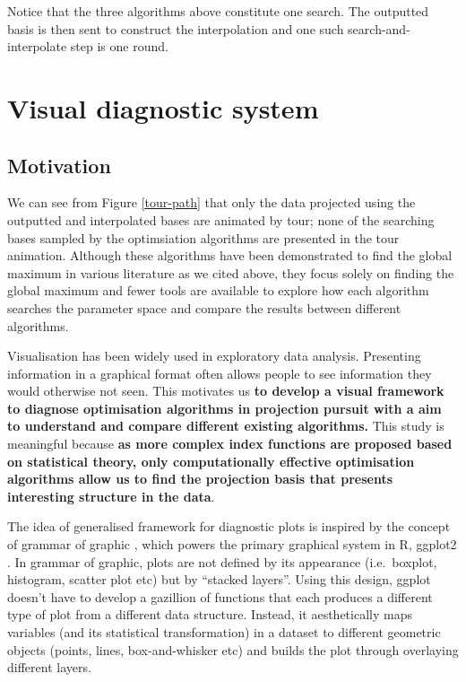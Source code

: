 \documentclass[12pt]{article}
\begin{document}
Notice that the three algorithms above constitute one search. The
outputted basis is then sent to construct the interpolation and one such
search-and-interpolate step is one round.

\newpage

\hypertarget{vis-diag}{%
\section{Visual diagnostic system}\label{vis-diag}}

\hypertarget{motivation}{%
\subsection{Motivation}\label{motivation}}

We can see from Figure \ref{tour-path} that only the data projected
using the outputted and interpolated bases are animated by tour; none of
the searching bases sampled by the optimsiation algorithms are presented
in the tour animation. Although these algorithms have been demonstrated
to find the global maximum in various literature as we cited above, they
focus solely on finding the global maximum and fewer tools are available
to explore how each algorithm searches the parameter space and compare
the results between different algorithms.

Visualisation has been widely used in exploratory data analysis.
Presenting information in a graphical format often allows people to see
information they would otherwise not seen. This motivates us \textbf{to
develop a visual framework to diagnose optimisation algorithms in
projection pursuit with a aim to understand and compare different
existing algorithms.} This study is meaningful because \textbf{as more
complex index functions are proposed based on statistical theory, only
computationally effective optimisation algorithms allow us to find the
projection basis that presents interesting structure in the data}.

The idea of generalised framework for diagnostic plots is inspired by
the concept of grammar of graphic \citep{wickham2010layered}, which
powers the primary graphical system in R, ggplot2 \citep{ggplot2}. In
grammar of graphic, plots are not defined by its appearance
(i.e.~boxplot, histogram, scatter plot etc) but by ``stacked layers''.
Using this design, ggplot doesn't have to develop a gazillion of
functions that each produces a different type of plot from a different
data structure. Instead, it aesthetically maps variables (and its
statistical transformation) in a dataset to different geometric objects
(points, lines, box-and-whisker etc) and builds the plot through
overlaying different layers.
\end{document}

